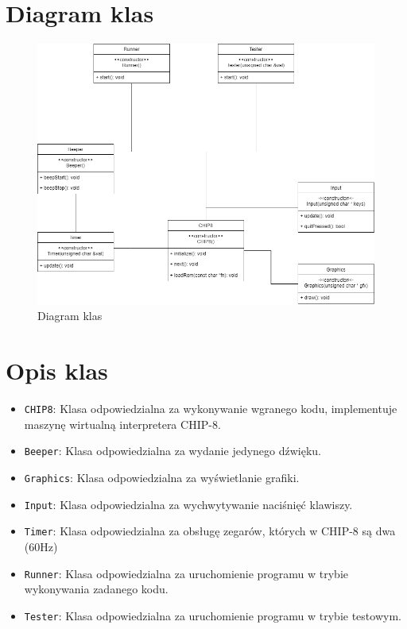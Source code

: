 \documentclass[a4paper,12pt]{report}
\begin{document}
\section{Diagram klas}
\begin{figure}[h]
    \centering
    \includegraphics[width=\textwidth]{diagrams/class_diagram.png}
    \caption{Diagram klas}
    \label{fig:my_label}
\end{figure}

\section{Opis klas}
\begin{itemize}
    \item \verb+CHIP8+: Klasa odpowiedzialna za wykonywanie wgranego kodu, implementuje maszynę wirtualną interpretera CHIP-8.
    \item \verb+Beeper+: Klasa odpowiedzialna za wydanie jedynego dźwięku.
    \item \verb+Graphics+: Klasa odpowiedzialna za wyświetlanie grafiki.
    \item \verb+Input+: Klasa odpowiedzialna za wychwytywanie naciśnięć klawiszy.
    \item \verb+Timer+: Klasa odpowiedzialna za obsługę zegarów, których w CHIP-8 są dwa (60Hz)
    \item \verb+Runner+: Klasa odpowiedzialna za uruchomienie programu w trybie wykonywania zadanego kodu.
    \item \verb+Tester+: Klasa odpowiedzialna za uruchomienie programu w trybie testowym.
\end{itemize}{}
\end{document}
